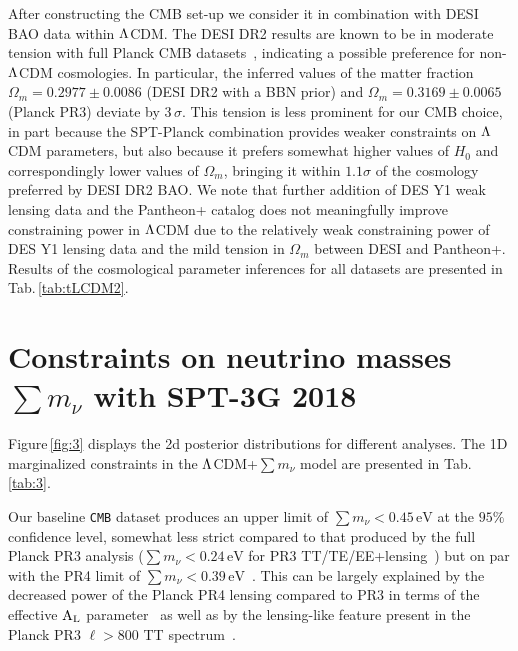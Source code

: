 \documentclass[12pt,a4paper]{article}
\newcommand{\eV}{\,\text{eV}}
\renewcommand\O{\Omega}
\newcommand\?{/\hspace{0pt}}
\def\Mnu{\sum m_\nu}
\begin{document}
After constructing the CMB set-up we consider it in combination with DESI BAO data within $\rm \Lambda$CDM. The DESI DR2 results are known to be in moderate tension with full Planck CMB datasets~\cite{DESI:2025zgx}, indicating a possible preference for non-$\rm \Lambda$CDM cosmologies. 
In particular, the inferred values of the matter fraction $\O_m = 0.2977\pm0.0086$ (DESI DR2 with a BBN prior) and $\O_m = 0.3169\pm0.0065$ (Planck PR3) deviate by 3\,$\sigma$. 
This tension is less prominent for our CMB choice, in part because the SPT-Planck combination provides weaker constraints on $\rm \Lambda$CDM parameters, but also because it prefers somewhat higher values of $H_0$ and correspondingly lower values of $\Omega_m$, bringing it within $1.1\sigma$ of the cosmology preferred by DESI DR2 BAO. We note that further addition of DES Y1 weak lensing data and the Pantheon+ catalog does not meaningfully improve constraining power in $\rm \Lambda$CDM due to the relatively weak constraining power of DES Y1 lensing data and the mild tension in $\O_m$ between DESI and Pantheon+. Results of the cosmological parameter inferences for all datasets are presented in Tab.\,\ref{tab:tLCDM2}. 


\section{Constraints on neutrino masses $\Mnu$ with SPT-3G 2018}
\label{sec:nuLCDM1}





Figure\,\ref{fig:3} displays the 2d posterior distributions for different analyses.
The 1D marginalized constraints in the $\rm \Lambda$CDM+$\sum m_\nu$ model are presented in Tab.\,\ref{tab:3}.

Our baseline \texttt{CMB} dataset produces an upper limit of $\Mnu < 0.45 \eV$ at the $95\%$ confidence level, somewhat less strict compared to that produced by the full Planck PR3 analysis ($\Mnu < 0.24 \eV$ for PR3 TT/TE/EE+lensing~\cite{Planck:2018vyg}) but on par with the PR4 limit of $\Mnu < 0.39 \eV$~\cite{Carron:2022eyg}. This can be largely explained by the decreased power of the Planck PR4 lensing compared to PR3 in terms of the effective $\rm A_L$ parameter~\cite{Allali:2024aiv} as well as by the lensing-like feature present in the Planck PR3 $\ell>800$ TT spectrum~\cite{Planck:2016tof}.
\end{document}
